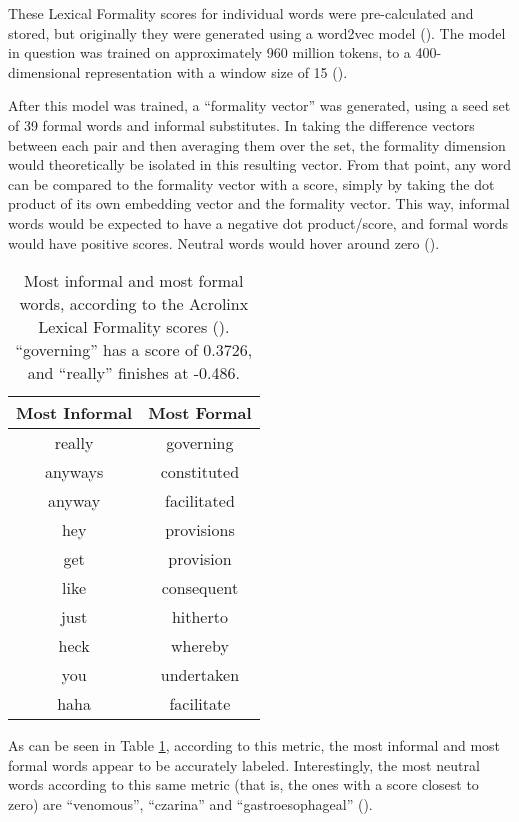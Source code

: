 These Lexical Formality scores for individual words were pre-calculated and stored, but originally they were generated using a word2vec model (\cite{mikolov2013word2vec}). The model in question was trained on approximately 960 million tokens, to a 400-dimensional representation with a window size of 15 (\cite{acro20147lf}).

After this model was trained, a ``formality vector'' was generated, using a seed set of 39 formal words and informal substitutes. In taking the difference vectors between each pair and then averaging them over the set, the formality dimension would theoretically be isolated in this resulting vector. From that point, any word can be compared to the formality vector with a score, simply by taking the dot product of its own embedding vector and the formality vector. This way, informal words would be expected to have a negative dot product/score, and formal words would have positive scores. Neutral words would hover around zero (\cite{acro20147lf}).

\begin{table}[h]
\centering
 \begin{tabular}{|| c | c ||} 
 \hline
 Most Informal & Most Formal\\ [0.3ex] 
 \hline\hline
 really & governing \\ 
 \hline
 anyways & constituted \\ 
 \hline
 anyway & facilitated \\ 
 \hline
 hey & provisions \\ 
 \hline
 get & provision \\ 
 \hline
 like & consequent \\ 
 \hline
 just & hitherto \\ 
 \hline
 heck & whereby \\ 
 \hline
 you & undertaken \\ 
 \hline
 haha & facilitate \\ 
 \hline
\end{tabular}
\caption{Most informal and most formal words, according to the Acrolinx Lexical Formality scores (\cite{acro20147lf}). ``governing'' has a score of 0.3726, and ``really'' finishes at -0.486.}
\label{acrolinxlf}
\end{table}

As can be seen in Table \ref{acrolinxlf}, according to this metric, the most informal and most formal words appear to be accurately labeled. Interestingly, the most neutral words according to this same metric (that is, the ones with a score closest to zero) are ``venomous'', ``czarina'' and ``gastroesophageal'' (\cite{acro20147lf}).